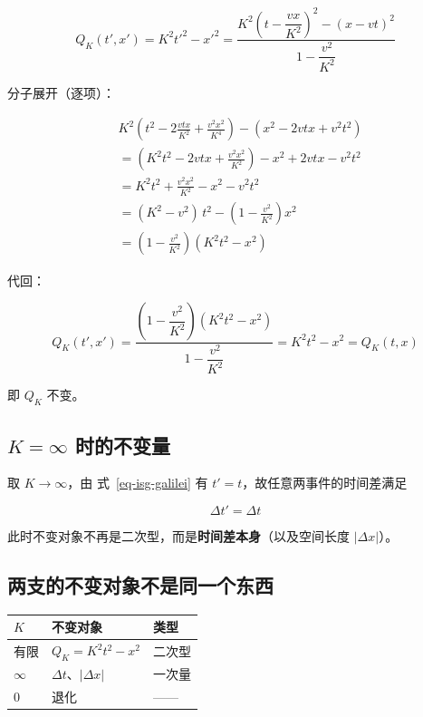 \documentclass[
  chinese,
  a4paper,
  UTF8,
  12pt,
  oneside,
  openany]{ctexbook}
\newcounter{none} %
\theoremstyle{plain}
\theoremstyle{plain}
\theoremstyle{plain}
\theoremstyle{definition}
\theoremstyle{plain}
\theoremstyle{plain}
\theoremstyle{remark}
\begin{document}
\[
Q_K(t',x')
=K^{2}t'^{2}-x'^{2}
=\frac{K^{2}\left(t-\dfrac{vx}{K^{2}}\right)^{2}-(x-vt)^{2}}{1-\dfrac{v^{2}}{K^{2}}}
\]

分子展开（逐项）：

\[
\begin{aligned}
&K^{2}\left(t^{2}-2\frac{vtx}{K^{2}}+\frac{v^{2}x^{2}}{K^{4}}\right)-\left(x^{2}-2vtx+v^{2}t^{2}\right)\\[4pt]
&=\left(K^{2}t^{2}-2vtx+\frac{v^{2}x^{2}}{K^{2}}\right)-x^{2}+2vtx-v^{2}t^{2}\\[4pt]
&=K^{2}t^{2}+\frac{v^{2}x^{2}}{K^{2}}-x^{2}-v^{2}t^{2}\\[4pt]
&=(K^{2}-v^{2})\,t^{2}-\left(1-\frac{v^{2}}{K^{2}}\right)x^{2}\\[4pt]
&=\left(1-\frac{v^{2}}{K^{2}}\right)\left(K^{2}t^{2}-x^{2}\right)
\end{aligned}
\]

代回：

\[
Q_K(t',x')
=\frac{\left(1-\dfrac{v^{2}}{K^{2}}\right)\left(K^{2}t^{2}-x^{2}\right)}{1-\dfrac{v^{2}}{K^{2}}}
=K^{2}t^{2}-x^{2}
=Q_K(t,x)
\]

即 \(Q_K\) 不变。

\subsection{\texorpdfstring{\(K=\infty\)
时的不变量}{K=\textbackslash infty 时的不变量}}\label{kinfty-ux65f6ux7684ux4e0dux53d8ux91cf}

取 \(K\to\infty\)，由 式~\ref{eq-isg-galilei} 有
\(t'=t\)，故任意两事件的时间差满足

\[
\Delta t'=\Delta t
\]

此时不变对象不再是二次型，而是\textbf{时间差本身}（以及空间长度
\(\lvert\Delta x\rvert\)）。

\subsection{两支的不变对象不是同一个东西}\label{ux4e24ux652fux7684ux4e0dux53d8ux5bf9ux8c61ux4e0dux662fux540cux4e00ux4e2aux4e1cux897f}

{\def\LTcaptype{none} %
\begin{longtable}[]{@{}lll@{}}
\toprule\noalign{}
\(K\) & 不变对象 & 类型 \\
\midrule\noalign{}
\endhead
\bottomrule\noalign{}
\endlastfoot
有限 & \(Q_K=K^{2}t^{2}-x^{2}\) & 二次型 \\
\(\infty\) & \(\Delta t\)、\(\lvert\Delta x\rvert\) & 一次量 \\
\(0\) & 退化 & ------ \\
\end{longtable}
}
\end{document}
